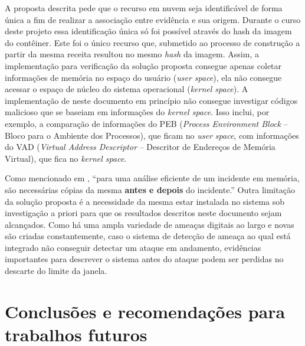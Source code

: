A proposta descrita pede que o recurso em nuvem seja identificável de forma única a fim de realizar a associação entre evidência e sua origem.
%
Durante o curso deste projeto essa identificação única só foi possível através do hash da imagem do contêiner. Este foi o único recurso que, submetido ao processo de construção a partir da mesma receita resultou no mesmo \textit{hash} da imagem.
%
Assim, a implementação para verificação da solução proposta consegue apenas coletar informações de memória no espaço do usuário (\textit{user space}), ela não consegue acessar o espaço de núcleo do sistema operacional (\textit{kernel space}). 
%
A implementação de \fancyname neste documento em princípio não consegue investigar códigos malicioso que se baseiam em informações do \textit{kernel space}.
%
Isso inclui, por exemplo, a comparação de informações do PEB (\textit{Process Environment Block} -- Bloco para o Ambiente dos Processos), que ficam no \textit{user space}, com informações do VAD (\textit{Virtual Address Descriptor} -- Descritor de Endereços de Memória Virtual), que fica no \textit{kernel space}. 
%

Como mencionado em \cite{CaseMemoryForensics:2014}, ``para uma análise eficiente de um incidente em memória, são necessárias cópias da mesma \textbf{antes e depois} do incidente.''
%
Outra limitação da solução proposta é a necessidade da mesma estar instalada no sistema sob investigação a priori para que os resultados descritos neste documento sejam alcançados.
%
Como há uma ampla variedade de ameaças digitais ao largo e novas são criadas constantemente, caso o sistema de detecção de ameaça ao qual \fancyname está integrado não conseguir detectar um ataque em andamento, evidências importantes para descrever o sistema antes do ataque podem ser perdidas no descarte do limite da janela.


\chapter{Conclusões e recomendações para trabalhos futuros}
\label{chp:proposta-concl-recom}

